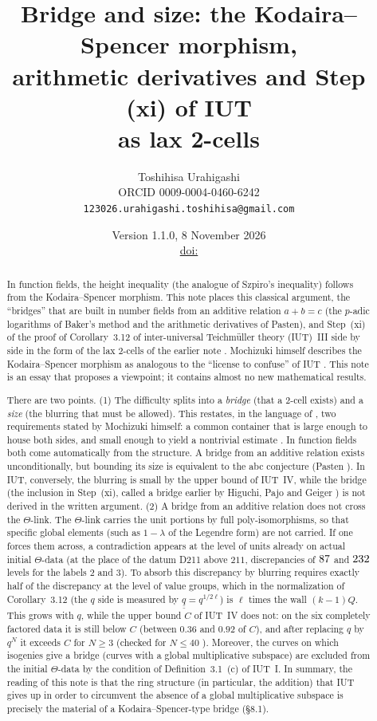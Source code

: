 \documentclass[11pt,a4paper]{article}
\title{Bridge and size: the Kodaira--Spencer morphism,\\ arithmetic derivatives and Step (xi) of IUT\\ as lax 2-cells}
\author{Toshihisa Urahigashi\\\small ORCID 0009-0004-0460-6242\\\small\texttt{123026.urahigashi.toshihisa@gmail.com}}
\date{Version 1.1.0, 8 November 2026\\\small\href{https://doi.org/\thedoi}{doi:\thedoi}}
\numberwithin{table}{section}
\newcommand{\qq}{\underline{\underline{q}}}
\theoremstyle{plain}
\theoremstyle{definition}
\begin{document}
\maketitle

\begin{abstract}
In function fields, the height inequality (the analogue of Szpiro's inequality) follows from the Kodaira--Spencer
morphism. This note places this classical argument, the ``bridges'' that are built in number fields from an additive
relation $a+b=c$ (the $p$-adic logarithms of Baker's method and the arithmetic derivatives of Pasten), and Step~(xi)
of the proof of Corollary~3.12 of inter-universal Teichm\"uller theory (IUT)~III side by side in the form of the lax
2-cells of the earlier note \cite{SL}. Mochizuki himself describes the Kodaira--Spencer morphism as analogous to the
``license to confuse'' of IUT \cite{Alien}. This note is an essay that proposes a viewpoint; it contains almost no new
mathematical results.

There are two points. (1) The difficulty splits into a \emph{bridge} (that a 2-cell exists) and a \emph{size} (the
blurring that must be allowed). This restates, in the language of \cite{SL}, two requirements stated by Mochizuki
himself: a common container that is large enough to house both sides, and small enough to yield a nontrivial estimate
\cite{Roots}. In function fields both come automatically from the structure. A bridge from an additive relation exists
unconditionally, but bounding its size is equivalent to the abc conjecture (Pasten \cite{Pa}). In IUT, conversely, the
blurring is small by the upper bound of IUT~IV, while the bridge (the inclusion in Step~(xi), called a bridge earlier
by Higuchi, Pajo and Geiger \cite{Hi,Pj,Ge3}) is not derived in the written argument. (2) A bridge from an additive relation does not cross the $\Theta$-link. The $\Theta$-link carries the
unit portions by full poly-isomorphisms, so that specific global elements (such as $1-\lambda$ of the Legendre form)
are not carried. If one forces them across, a contradiction appears at the level of units already on actual initial
$\Theta$-data (at the place of the datum D211 above $211$, discrepancies of $87$ and $232$ levels for the
labels $2$ and $3$). To absorb this discrepancy by blurring requires exactly half of the discrepancy at the level of
value groups, which in the normalization of Corollary~3.12 (the $q$ side is measured by $\qq=q^{1/2\ell}$) is $\ell$
times the wall $(k-1)Q$. This grows with $q$, while the upper bound $C$ of IUT~IV does not: on the six completely
factored data it is still below $C$ (between $0.36$ and $0.92$ of $C$), and after replacing $q$ by $q^N$ it exceeds $C$
for $N\ge3$ (checked for $N\le40$ \cite{TC}). Moreover, the curves on
which isogenies give a bridge (curves with a global multiplicative subspace) are excluded from the initial
$\Theta$-data by the condition of Definition~3.1~(c) of IUT~I. In summary, the reading of this note is that the ring
structure (in particular, the addition) that IUT gives up in order to circumvent the absence of a global multiplicative
subspace is precisely the material of a Kodaira--Spencer-type bridge (\S8.1).


\end{abstract}
\end{document}
